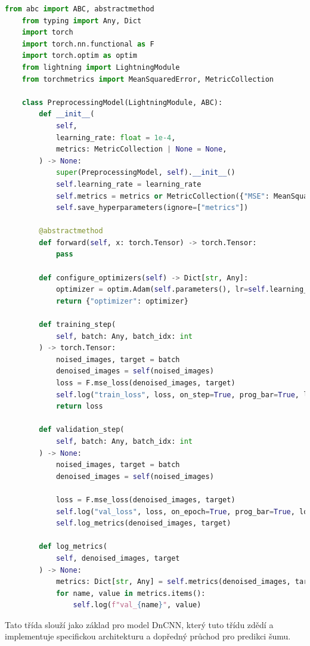 \documentclass[male,czech,api_ing]{thesis}
\begin{document}
\begin{lstlisting}[language=Python, caption={Třída pro modelu redukující šum}, label={lst:PreprocessingClass}]
    from abc import ABC, abstractmethod
    from typing import Any, Dict
    import torch
    import torch.nn.functional as F
    import torch.optim as optim
    from lightning import LightningModule
    from torchmetrics import MeanSquaredError, MetricCollection

    class PreprocessingModel(LightningModule, ABC):
        def __init__(
            self,
            learning_rate: float = 1e-4,
            metrics: MetricCollection | None = None,
        ) -> None:
            super(PreprocessingModel, self).__init__()
            self.learning_rate = learning_rate
            self.metrics = metrics or MetricCollection({"MSE": MeanSquaredError()})
            self.save_hyperparameters(ignore=["metrics"])

        @abstractmethod
        def forward(self, x: torch.Tensor) -> torch.Tensor:
            pass

        def configure_optimizers(self) -> Dict[str, Any]:
            optimizer = optim.Adam(self.parameters(), lr=self.learning_rate)
            return {"optimizer": optimizer}

        def training_step(
            self, batch: Any, batch_idx: int
        ) -> torch.Tensor:
            noised_images, target = batch
            denoised_images = self(noised_images)
            loss = F.mse_loss(denoised_images, target)
            self.log("train_loss", loss, on_step=True, prog_bar=True, logger=True)
            return loss

        def validation_step(
            self, batch: Any, batch_idx: int
        ) -> None:
            noised_images, target = batch
            denoised_images = self(noised_images)

            loss = F.mse_loss(denoised_images, target)
            self.log("val_loss", loss, on_epoch=True, prog_bar=True, logger=True)
            self.log_metrics(denoised_images, target)

        def log_metrics(
            self, denoised_images, target
        ) -> None:
            metrics: Dict[str, Any] = self.metrics(denoised_images, target)
            for name, value in metrics.items():
                self.log(f"val_{name}", value)
\end{lstlisting}

Tato třída slouží jako základ pro model DnCNN, který tuto třídu zdědí a implementuje specifickou architekturu a dopředný průchod pro predikci šumu.
\end{document}
